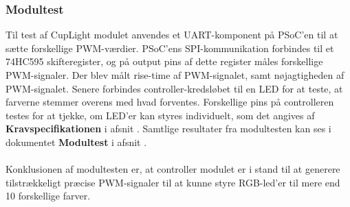 \documentclass[Rapport/Rapport_main.tex]{subfiles}
\begin{document}
\subsubsection{Modultest}
Til test af CupLight modulet anvendes et UART-komponent på PSoC'en til at sætte forskellige PWM-værdier. PSoC'ens SPI-kommunikation forbindes til et 74HC595 skifteregister, og på output pins af dette register måles forskellige PWM-signaler. Der blev målt rise-time af PWM-signalet, samt nøjagtigheden af PWM-signalet. Senere forbindes controller-kredsløbet til en LED for at teste, at farverne stemmer overens med hvad forventes. Forskellige pins på controlleren testes for at tjekke, om LED'er kan styres individuelt, som det angives af \textbf{Kravspecifikationen} i afsnit . Samtlige resultater fra modultesten kan ses i dokumentet \textbf{Modultest} i afsnit .\\\\
Konklusionen af modultesten er, at controller modulet er i stand til at generere tilstrækkeligt præcise PWM-signaler til at kunne styre RGB-led'er til mere end 10 forskellige farver. 
\end{document}
